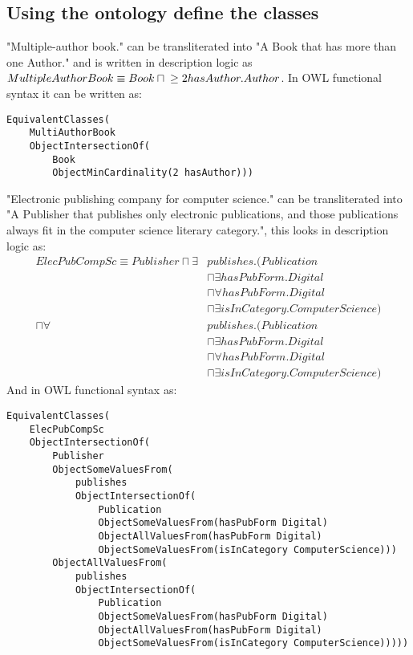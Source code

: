 \documentclass[a4paper,12pt]{article}
\begin{document}
\subsection[Define classes]{Using the ontology define the classes}
"Multiple-author book." can be transliterated into "A Book that has more than
one Author." and is written in description logic as $ MultipleAuthorBook\\
\equiv Book \sqcap {} \geq 2hasAuthor.Author $.  In OWL functional syntax it
can be written as:
\begin{Verbatim}[samepage=true]
EquivalentClasses(
    MultiAuthorBook
    ObjectIntersectionOf(
        Book
        ObjectMinCardinality(2 hasAuthor)))
\end{Verbatim}

"Electronic publishing company for computer science." can be transliterated
into "A Publisher that publishes only electronic publications, and those
publications always fit in the computer science literary category.", this looks
in description logic as:
\begin{align*}
ElecPubCompSc \equiv Publisher \sqcap \exists &publishes.(Publication\\
                             &\sqcap \exists hasPubForm.Digital\\
                             &\sqcap \forall hasPubForm.Digital\\
                             &\sqcap \exists isInCategory.ComputerScience)\\
                               \sqcap \forall &publishes.(Publication\\
                             &\sqcap \exists hasPubForm.Digital\\
                             &\sqcap \forall hasPubForm.Digital\\
                             &\sqcap \exists isInCategory.ComputerScience)
\end{align*}
And in OWL functional syntax as:
\begin{Verbatim}[samepage=true]
EquivalentClasses(
    ElecPubCompSc
    ObjectIntersectionOf(
        Publisher
        ObjectSomeValuesFrom(
            publishes
            ObjectIntersectionOf(
                Publication
                ObjectSomeValuesFrom(hasPubForm Digital)
                ObjectAllValuesFrom(hasPubForm Digital)
                ObjectSomeValuesFrom(isInCategory ComputerScience)))
        ObjectAllValuesFrom(
            publishes
            ObjectIntersectionOf(
                Publication
                ObjectSomeValuesFrom(hasPubForm Digital)
                ObjectAllValuesFrom(hasPubForm Digital)
                ObjectSomeValuesFrom(isInCategory ComputerScience)))))
\end{Verbatim}
\end{document}
